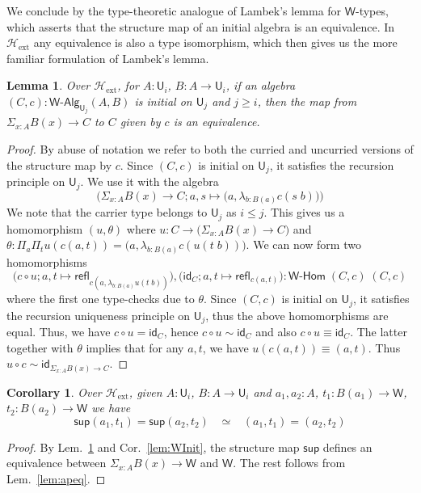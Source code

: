 \documentclass[reqno,10pt,a4paper,oneside]{amsart}
\newcommand{\comp}{\circ}
\newcommand{\idfun}[1]{\mathsf{id}_{#1}}
\newcommand{\prd}[1]{\Pi_{#1}}
\newcommand{\sm}[1]{\Sigma_{#1}}
\newcommand{\lam}[1]{\lambda_{#1}}
\newcommand{\refl}{\mathsf{refl}}
\newcommand{\W}{\mathsf{W}}
\newcommand{\wsup}{\mathsf{sup}}
\newcommand{\UU}{\mathsf{U}}
\newcommand{\WAlg}{\mathsf{W}\text{-}\mathsf{Alg}}
\newcommand{\WHom}{\mathsf{W}\text{-}\mathsf{Hom}}
\newcommand{\Hext}{\mathcal{H}_{\mathrm{ext}}}
\numberwithin{equation}{section}
\theoremstyle{mythm}
\newtheorem{lemma}[theorem]{Lemma}
\newtheorem{corollary}[theorem]{Corollary}
\theoremstyle{mydef}
\theoremstyle{myrmk}
\begin{document}
We conclude by the type-theoretic analogue of Lambek's lemma for $\W$-types, which asserts that the structure map of an initial algebra is an equivalence. In $\Hext$ any equivalence is also a type isomorphism, which then gives us the more familiar formulation of Lambek's lemma.

\begin{lemma}\label{lem:ExtLambek}
Over $\Hext$, for $A:\UU_i$, $B : A \to \UU_i$, if an algebra $(C,c) : \WAlg_{\UU_j}(A,B)$ is initial on $\UU_j$ and $j \geq i$, then the map from $\sm{x:A} B(x) \to C$ to $C$ given by $c$ is an equivalence.
\end{lemma}
\begin{proof}
By abuse of notation we refer to both the curried and uncurried versions of the structure map by $c$. Since $(C,c)$ is initial on $\UU_j$, it satisfies the recursion principle on $\UU_j$. We use it with the algebra \[\Big(\sm{x:A} B(x) \to C; a,s \mapsto \big(a,\lam{b:B(a)} c(s\;b)\big)\Big)\]
We note that the carrier type belongs to $\UU_j$ as $i \leq j$. This gives us a homomorphism $(u,\theta)$ where $u : C \to \big(\sm{x:A} B(x) \to C\big)$ and $\theta : \prd{a}\prd{t} u(c(a,t)) = \big(a,\lam{b:B(a)} c(u(t\;b))\big)$.  We can now form two homomorphisms
\[\big(c \comp u; a,t \mapsto \refl_{c(a,\lam{b:B(a)}u(t\;b))}\big), \big(\idfun{C}; a,t \mapsto \refl_{c(a,t)}\big) : \WHom \; (C,c) \; (C,c)\] where the first one type-checks due to $\theta$. Since $(C,c)$ is initial on $\UU_j$, it satisfies the recursion uniqueness principle on $\UU_j$, thus the above homomorphisms are equal. Thus, we have $c \comp u = \idfun{C}$, hence $c \comp u \sim \idfun{C}$ and also $c \comp u \equiv \idfun{C}$. The latter together with $\theta$ implies that for any $a,t$, we have $u(c(a,t)) \equiv (a,t)$. Thus $u \comp c \sim \idfun{\sm{x:A} B(x) \to C}$.
\end{proof}

\begin{corollary}
Over $\Hext$, given $A:\UU_i$, $B : A \to \UU_i$ and $a_1,a_2:A$, $t_1 : B(a_1) \to \W$, $t_2 : B(a_2) \to \W$ we have
\[ \wsup(a_1,t_1) = \wsup(a_2,t_2) \;\;\; \simeq \;\;\; (a_1,t_1) = (a_2,t_2)\]
\end{corollary}
\begin{proof}
By Lem.~\ref{lem:ExtLambek} and Cor.~\ref{lem:WInit}, the structure map $\wsup$ defines an equivalence between $\sm{x:A} B(x) \to \W$ and $\W$. The rest follows from Lem.~\ref{lem:apeq}.
\end{proof}
\end{document}
